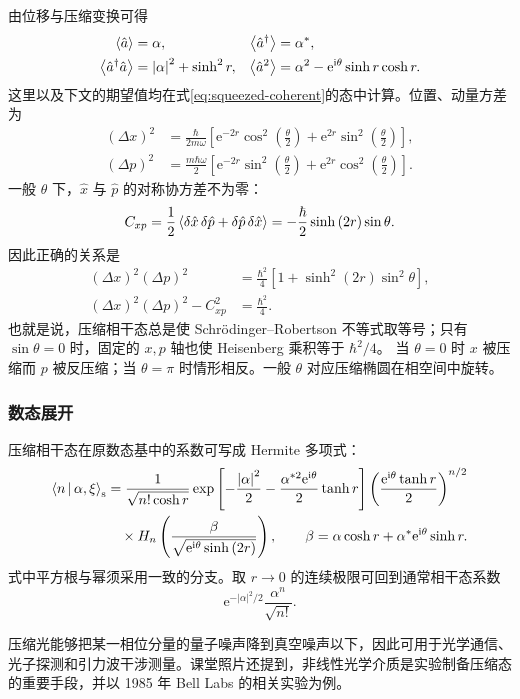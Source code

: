 由位移与压缩变换可得
\begin{align}
\Braket{\hat a}&=\alpha,
&\Braket{\hat a^\dagger}&=\alpha^*,\\
\Braket{\hat a^\dagger\hat a}&=\left|\alpha\right|^2+\sinh^2r,
&\Braket{\hat a^2}&=\alpha^2-\mathrm{e}^{\mathrm{i}\theta}\sinh r\cosh r.
\end{align}
这里以及下文的期望值均在式\eqref{eq:squeezed-coherent}的态中计算。位置、动量方差为
\begin{align}
\left(\Delta x\right)^2
&=\frac{\hbar}{2m\omega}\left[
\mathrm{e}^{-2r}\cos^2\left(\frac{\theta}{2}\right)
+\mathrm{e}^{2r}\sin^2\left(\frac{\theta}{2}\right)\right],\\
\left(\Delta p\right)^2
&=\frac{m\hbar\omega}{2}\left[
\mathrm{e}^{-2r}\sin^2\left(\frac{\theta}{2}\right)
+\mathrm{e}^{2r}\cos^2\left(\frac{\theta}{2}\right)\right].
\end{align}
一般 $\theta$ 下，$\hat x$ 与 $\hat p$ 的对称协方差不为零：
\begin{equation}
C_{xp}=\frac12\Braket{\delta\hat x\,\delta\hat p+\delta\hat p\,\delta\hat x}
=-\frac{\hbar}{2}\sinh\left(2r\right)\sin\theta.
\end{equation}
因此正确的关系是
\begin{align}
\left(\Delta x\right)^2\left(\Delta p\right)^2
&=\frac{\hbar^2}{4}\left[1+\sinh^2\left(2r\right)\sin^2\theta\right],\\
\left(\Delta x\right)^2\left(\Delta p\right)^2-C_{xp}^2
&=\frac{\hbar^2}{4}.
\end{align}
也就是说，压缩相干态总是使 Schr\"odinger--Robertson 不等式取等号；只有
$\sin\theta=0$ 时，固定的 $x,p$ 轴也使 Heisenberg 乘积等于 $\hbar^2/4$。
当 $\theta=0$ 时 $x$ 被压缩而 $p$ 被反压缩；当 $\theta=\pi$ 时情形相反。一般 $\theta$ 对应压缩椭圆在相空间中旋转。

\subsubsection{数态展开}
压缩相干态在原数态基中的系数可写成 Hermite 多项式：
\begin{align}
\Braket{n|\alpha,\xi}_{\mathrm{s}}
&=\frac{1}{\sqrt{n!\cosh r}}
\exp\left[-\frac{\left|\alpha\right|^2}{2}
-\frac{\alpha^{*2}\mathrm{e}^{\mathrm{i}\theta}}{2}\tanh r\right]
\left(\frac{\mathrm{e}^{\mathrm{i}\theta}\tanh r}{2}\right)^{n/2}\notag\\
&\quad\times H_n\left(\frac{\beta}{\sqrt{\mathrm{e}^{\mathrm{i}\theta}\sinh\left(2r\right)}}\right),
\qquad
\beta=\alpha\cosh r+\alpha^*\mathrm{e}^{\mathrm{i}\theta}\sinh r.
\end{align}
式中平方根与幂须采用一致的分支。取 $r\to0$ 的连续极限可回到通常相干态系数
\begin{equation}
\mathrm{e}^{-\left|\alpha\right|^2/2}\frac{\alpha^n}{\sqrt{n!}}.
\end{equation}

压缩光能够把某一相位分量的量子噪声降到真空噪声以下，因此可用于光学通信、光子探测和引力波干涉测量。课堂照片还提到，非线性光学介质是实验制备压缩态的重要手段，并以 1985 年 Bell Labs 的相关实验为例。
